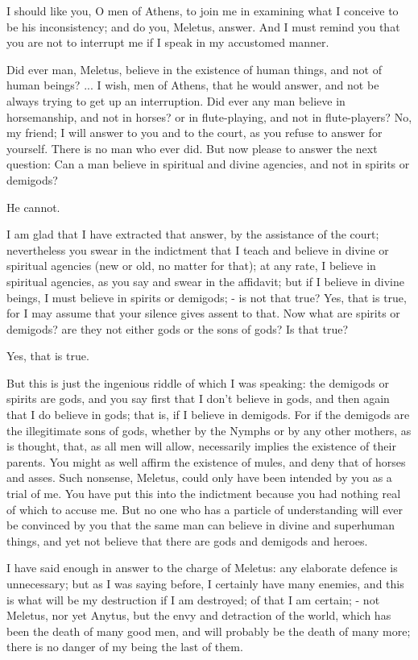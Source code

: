 I should like you, O men of Athens, to join me in examining what I
conceive to be his inconsistency; and do you, Meletus, answer. And
I must remind you that you are not to interrupt me if I speak in my
accustomed manner. 

Did ever man, Meletus, believe in the existence of human things, and
not of human beings? ... I wish, men of Athens, that he would answer,
and not be always trying to get up an interruption. Did ever any man
believe in horsemanship, and not in horses? or in flute-playing, and
not in flute-players? No, my friend; I will answer to you and to the
court, as you refuse to answer for yourself. There is no man who ever
did. But now please to answer the next question: Can a man believe
in spiritual and divine agencies, and not in spirits or demigods?

He cannot. 

I am glad that I have extracted that answer, by the assistance of
the court; nevertheless you swear in the indictment that I teach and
believe in divine or spiritual agencies (new or old, no matter for
that); at any rate, I believe in spiritual agencies, as you say and
swear in the affidavit; but if I believe in divine beings, I must
believe in spirits or demigods; - is not that true? Yes, that is true,
for I may assume that your silence gives assent to that. Now what
are spirits or demigods? are they not either gods or the sons of gods?
Is that true? 

Yes, that is true. 

But this is just the ingenious riddle of which I was speaking: the
demigods or spirits are gods, and you say first that I don't believe
in gods, and then again that I do believe in gods; that is, if I believe
in demigods. For if the demigods are the illegitimate sons of gods,
whether by the Nymphs or by any other mothers, as is thought, that,
as all men will allow, necessarily implies the existence of their
parents. You might as well affirm the existence of mules, and deny
that of horses and asses. Such nonsense, Meletus, could only have
been intended by you as a trial of me. You have put this into the
indictment because you had nothing real of which to accuse me. But
no one who has a particle of understanding will ever be convinced
by you that the same man can believe in divine and superhuman things,
and yet not believe that there are gods and demigods and heroes.

I have said enough in answer to the charge of Meletus: any elaborate
defence is unnecessary; but as I was saying before, I certainly have
many enemies, and this is what will be my destruction if I am destroyed;
of that I am certain; - not Meletus, nor yet Anytus, but the envy
and detraction of the world, which has been the death of many good
men, and will probably be the death of many more; there is no danger
of my being the last of them. 

